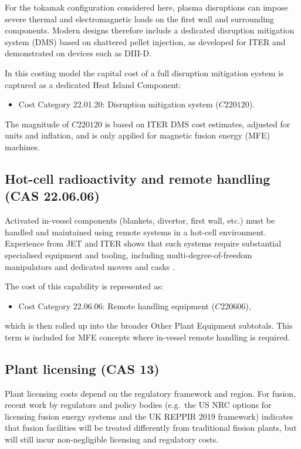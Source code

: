For the tokamak configuration considered here, plasma disruptions can
impose severe thermal and electromagnetic loads on the first wall and
surrounding components\cite{Piet1982Potential}. Modern designs therefore
include a dedicated disruption mitigation system (DMS) based on
shattered pellet injection, as developed for ITER and demonstrated on
devices such as DIII-D\cite{baylor2019shattered,iter2001final}.

In this costing model the capital cost of a full disruption mitigation
system is captured as a dedicated Heat Island Component:
\begin{itemize}
  \item Cost Category 22.01.20: Disruption mitigation system
        (\(C220120\)).
\end{itemize}
The magnitude of \(C220120\) is based on ITER DMS cost estimates,
adjusted for units and inflation, and is only applied for magnetic
fusion energy (MFE) machines.

\subsection{Hot-cell radioactivity and remote handling (CAS 22.06.06)}

Activated in-vessel components (blankets, divertor, first wall, etc.)
must be handled and maintained using remote systems in a hot-cell
environment. Experience from JET and ITER shows that such systems
require substantial specialised equipment and tooling, including
multi-degree-of-freedom manipulators and dedicated movers and casks
\cite{hamilton2001development,contractforiter}.

The cost of this capability is represented as:
\begin{itemize}
  \item Cost Category 22.06.06: Remote handling equipment
        (\(C220606\)),
\end{itemize}
which is then rolled up into the broader Other Plant Equipment
subtotals. This term is included for MFE concepts where in-vessel
remote handling is required.

\subsection{Plant licensing (CAS 13)}

Plant licensing costs depend on the regulatory framework and region. For
fusion, recent work by regulators and policy bodies (e.g.\ the US NRC
options for licensing fusion energy systems and the UK REPPIR 2019
framework) indicates that fusion facilities will be treated differently
from traditional fission plants, but will still incur non-negligible
licensing and regulatory costs\cite{White2021Regulation,NRCFusion2023,
UKREPPIR2019,UKFusion2022}.

